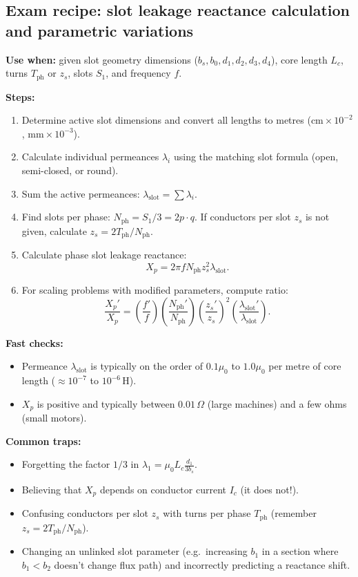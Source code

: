 \subsection{Exam recipe: slot leakage reactance calculation and parametric variations}

\textbf{Use when:} given slot geometry dimensions (\(b_s, b_0, d_1, d_2, d_3, d_4\)), core length \(L_c\), turns \(T_{\mathrm{ph}}\) or \(z_s\), slots \(S_1\), and frequency \(f\).

\textbf{Steps:}
\begin{enumerate}
  \item Determine active slot dimensions and convert all lengths to metres (\(\mathrm{cm}\times 10^{-2}\), \(\mathrm{mm}\times 10^{-3}\)).
  \item Calculate individual permeances \(\lambda_i\) using the matching slot formula (open, semi-closed, or round).
  \item Sum the active permeances: \(\lambda_{\mathrm{slot}} = \sum \lambda_i\).
  \item Find slots per phase: \(N_{\mathrm{ph}} = S_1 / 3 = 2p \cdot q\). If conductors per slot \(z_s\) is not given, calculate \(z_s = 2 T_{\mathrm{ph}} / N_{\mathrm{ph}}\).
  \item Calculate phase slot leakage reactance:
  \[
  X_p = 2\pi f N_{\mathrm{ph}} z_s^2 \lambda_{\mathrm{slot}}.
  \]
  \item For scaling problems with modified parameters, compute ratio:
  \[
  \frac{X_p'}{X_p} = \left(\frac{f'}{f}\right) \left(\frac{N_{\mathrm{ph}}'}{N_{\mathrm{ph}}}\right) \left(\frac{z_s'}{z_s}\right)^2 \left(\frac{\lambda_{\mathrm{slot}}'}{\lambda_{\mathrm{slot}}}\right).
  \]
\end{enumerate}

\textbf{Fast checks:}
\begin{itemize}
  \item Permeance \(\lambda_{\mathrm{slot}}\) is typically on the order of \(0.1\mu_0\) to \(1.0\mu_0\) per metre of core length (\(\approx 10^{-7}\) to \(10^{-6}\,\mathrm{H}\)).
  \item \(X_p\) is positive and typically between \(0.01\,\Omega\) (large machines) and a few ohms (small motors).
\end{itemize}

\textbf{Common traps:}
\begin{itemize}
  \item Forgetting the factor \(1/3\) in \(\lambda_1 = \mu_0 L_c \frac{d_1}{3 b_s}\).
  \item Believing that \(X_p\) depends on conductor current \(I_c\) (it does not!).
  \item Confusing conductors per slot \(z_s\) with turns per phase \(T_{\mathrm{ph}}\) (remember \(z_s = 2 T_{\mathrm{ph}} / N_{\mathrm{ph}}\)).
  \item Changing an unlinked slot parameter (e.g.\ increasing \(b_1\) in a section where \(b_1<b_2\) doesn't change flux path) and incorrectly predicting a reactance shift.
\end{itemize}

